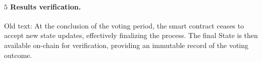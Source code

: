 \paragraph{$\boxed{5}$ Results verification.}


Old text: At the conclusion of the voting period, the smart contract ceases to accept new state updates, effectively finalizing the process. The final State is then available on-chain for verification, providing an immutable record of the voting outcome.